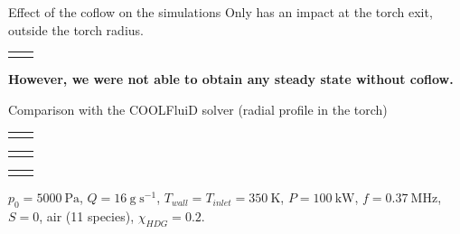 \documentclass[24pt,t,table, aspectratio=169]{beamer}
\begin{document}
\begin{frame}{Effect of the coflow on the simulations}
Only has an impact at the torch exit, outside the torch radius.

\begin{tabular}{cc}
 & 
\end{tabular}

\textbf{However, we were not able to obtain any steady state without coflow.}

\end{frame}

\begin{frame}{Comparison with the COOLFluiD solver (radial profile in the torch)}


{

\begin{center}
\begin{tabular}{cc}
 &

\end{tabular}
\end{center}

}

{
\begin{tabular}{cc}
 & 
\end{tabular}
}

{
\begin{tabular}{cc}
 & 
\end{tabular}
}

\small
$p_0 = \SI{5000}{\pascal}$, $Q = \SI{16}{\gram\;\second^{-1}}$, $T_{wall} = T_{inlet} = \SI{350}{\kelvin}$, $P = \SI{100}{\kilo\watt}$, $f = \SI{0.37}{\mega\hertz}$, $S = 0$, air (11 species), $\chi_{HDG} = 0.2$.

\end{frame}
\end{document}
